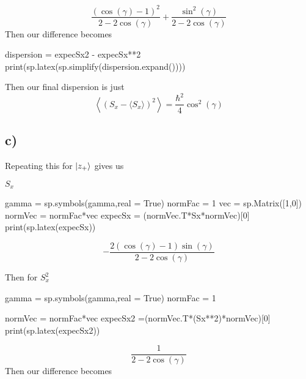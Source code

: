 \documentclass[]{article}
\newenvironment{Shaded}{\begin{snugshade}}{\end{snugshade}}
\newcommand{\NormalTok}[1]{#1}
\begin{document}
\[
\frac{\left(\cos{\left(\gamma \right)} - 1\right)^{2}}{2 - 2 \cos{\left(\gamma \right)}} + \frac{\sin^{2}{\left(\gamma \right)}}{2 - 2 \cos{\left(\gamma \right)}}
\] Then our difference becomes

\begin{Shaded}
\begin{Highlighting}[]
\NormalTok{dispersion = expecSx2 {-} expecSx**2}
\NormalTok{print(sp.latex(sp.simplify(dispersion.expand())))}
\end{Highlighting}
\end{Shaded}

Then our final dispersion is just \[
\left\langle \left(S_x - \langle S_x \rangle\right)^2 \right\rangle = \frac{\hbar^{2}}{4}\cos^{2}{\left(\gamma \right)}
\]

\hypertarget{c-1}{%
\subsection{c)}\label{c-1}}

Repeating this for \(\ket{z_{+}}\) gives us

\(S_{x}\)

\begin{Shaded}
\begin{Highlighting}[]
\NormalTok{gamma = sp.symbols(\textquotesingle{}gamma\textquotesingle{},real = True)}
\NormalTok{normFac = 1}
\NormalTok{vec = sp.Matrix([1,0])}
\NormalTok{normVec = normFac*vec}
\NormalTok{expecSx = (normVec.T*Sx*normVec)[0]}
\NormalTok{print(sp.latex(expecSx))}
\end{Highlighting}
\end{Shaded}

\[
- \frac{2 \left(\cos{\left(\gamma \right)} - 1\right) \sin{\left(\gamma \right)}}{2 - 2 \cos{\left(\gamma \right)}}
\]

Then for \(S_{x}^{2}\)

\begin{Shaded}
\begin{Highlighting}[]
\NormalTok{gamma = sp.symbols(\textquotesingle{}gamma\textquotesingle{},real = True)}
\NormalTok{normFac = 1}

\NormalTok{normVec = normFac*vec}
\NormalTok{expecSx2 =(normVec.T*(Sx**2)*normVec)[0]}
\NormalTok{print(sp.latex(expecSx2))}
\end{Highlighting}
\end{Shaded}

\[
\frac{1}{2 - 2 \cos{\left(\gamma \right)}}
\] Then our difference becomes
\end{document}
